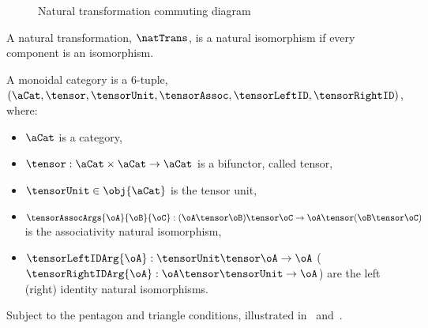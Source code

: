 \begin{figure}[ht]
    \centering
{}
\caption{Natural transformation commuting diagram}
\label{fig:natTrans}
\end{figure}

\begin{definition}
    A natural transformation, $\natTrans$, is a natural isomorphism if every
    component is an isomorphism.
\end{definition}

\begin{definition}\label{defn:monCat}
    A monoidal category is a 6-tuple, $(\aCat, \tensor, \tensorUnit,
    \tensorAssoc, \tensorLeftID, \tensorRightID)$, where:
    \begin{itemize}
        \item $\aCat$ is a category,
        \item $\tensor : \aCat \times \aCat \to \aCat$ is a bifunctor, called
            tensor,
        \item $\tensorUnit \in \obj{\aCat}$ is the tensor unit,
        \item $\tensorAssocArgs{\oA}{\oB}{\oC} : (\oA \tensor \oB) \tensor \oC \to \oA \tensor (\oB
            \tensor \oC)$ is the associativity natural isomorphism,
        \item $\tensorLeftIDArg{\oA} : \tensorUnit \tensor \oA \to \oA$
            ($\tensorRightIDArg{\oA} : \oA \tensor \tensorUnit \to \oA $) are the
            left (right) identity natural isomorphisms.
    \end{itemize}
    Subject to the pentagon and triangle conditions, illustrated in~
    and~.
\end{definition}

